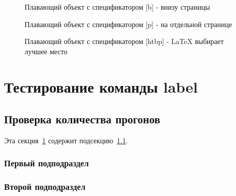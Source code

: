 \documentclass[12pt]{article}
\begin{document}
\lipsum[9]

\begin{figure}[b]
    \centering
    \caption{Плавающий объект с спецификатором [b] - внизу страницы}
    \label{fig:bottom}
\end{figure}

\lipsum[10]

\begin{figure}[p]
    \centering
    \caption{Плавающий объект с спецификатором [p] - на отдельной странице}
    \label{fig:page}
\end{figure}

\lipsum[11]

\begin{figure}[htbp]
    \centering
    \caption{Плавающий объект с спецификатором [htbp] - LaTeX выбирает лучшее место}
    \label{fig:flexible}
\end{figure}

\lipsum[12]

\section{Тестирование команды label}
\label{sec:labeltests}

\subsection{Проверка количества прогонов}
\label{subsec:runs}

Эта секция~\ref{sec:labeltests} содержит подсекцию~\ref{subsec:runs}.

\subsubsection{Первый подподраздел}
\label{subsubsec:first}

\lipsum[13]

\subsubsection{Второй подподраздел}
\label{subsubsec:second}
\end{document}
